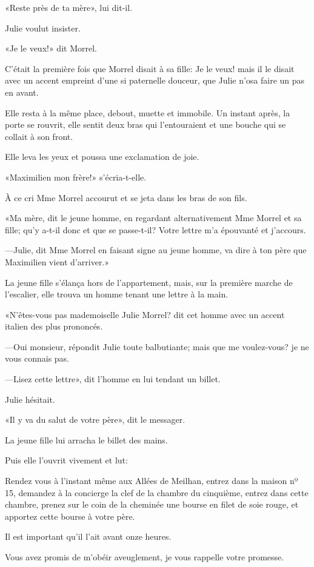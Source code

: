 «Reste près de ta mère», lui dit-il.

Julie voulut insister.

«Je le veux!» dit Morrel.

C'était la première fois que Morrel disait à sa fille: Je le veux! mais il le disait avec un accent empreint d'une si paternelle douceur, que Julie n'osa faire un pas en avant.

Elle resta à la même place, debout, muette et immobile. Un instant après, la porte se rouvrit, elle sentit deux bras qui l'entouraient et une bouche qui se collait à son front.

Elle leva les yeux et poussa une exclamation de joie.

«Maximilien mon frère!» s'écria-t-elle.

À ce cri Mme Morrel accourut et se jeta dans les bras de son fils.

«Ma mère, dit le jeune homme, en regardant alternativement Mme Morrel et sa fille; qu'y a-t-il donc et que se passe-t-il? Votre lettre m'a épouvanté et j'accours.

—Julie, dit Mme Morrel en faisant signe au jeune homme, va dire à ton père que Maximilien vient d'arriver.»

La jeune fille s'élança hors de l'appartement, mais, sur la première marche de l'escalier, elle trouva un homme tenant une lettre à la main.

«N'êtes-vous pas mademoiselle Julie Morrel? dit cet homme avec un accent italien des plus prononcés.

—Oui monsieur, répondit Julie toute balbutiante; mais que me voulez-vous? je ne vous connais pas.

—Lisez cette lettre», dit l'homme en lui tendant un billet.

Julie hésitait.

«Il y va du salut de votre père», dit le messager.

La jeune fille lui arracha le billet des mains.

Puis elle l'ouvrit vivement et lut:

\begin{mail}{}{}
Rendez vous à l'instant même aux Allées de Meilhan, entrez dans la maison nº 15, demandez à la concierge la clef de la chambre du cinquième, entrez dans cette chambre, prenez sur le coin de la cheminée une bourse en filet de soie rouge, et apportez cette bourse à votre père.

Il est important qu'il l'ait avant onze heures.

Vous avez promis de m'obéir aveuglement, je vous rappelle votre promesse.

\end{mail}

